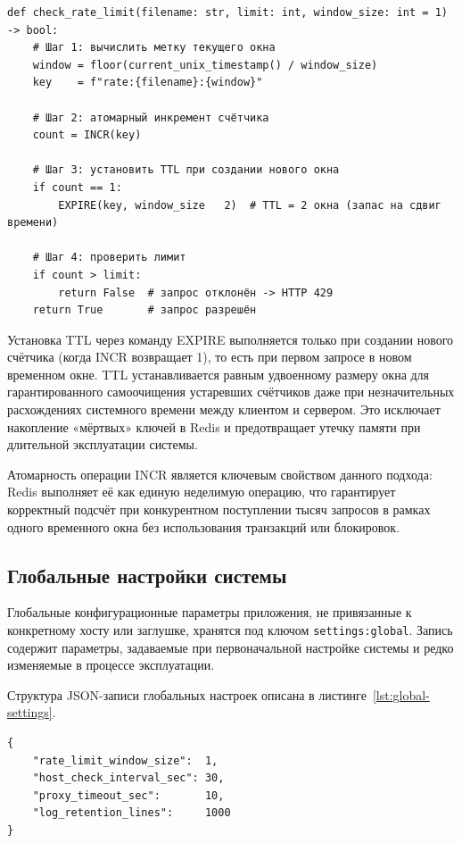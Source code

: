 \begin{listing}[H]
\caption{Псевдокод алгоритма Fixed Window Counter}
\label{lst:rate-limiter}
\begin{verbatim}
def check_rate_limit(filename: str, limit: int, window_size: int = 1) -> bool:
    # Шаг 1: вычислить метку текущего окна
    window = floor(current_unix_timestamp() / window_size)
    key    = f"rate:{filename}:{window}"

    # Шаг 2: атомарный инкремент счётчика
    count = INCR(key)

    # Шаг 3: установить TTL при создании нового окна
    if count == 1:
        EXPIRE(key, window_size   2)  # TTL = 2 окна (запас на сдвиг времени)

    # Шаг 4: проверить лимит
    if count > limit:
        return False  # запрос отклонён -> HTTP 429
    return True       # запрос разрешён
\end{verbatim}
\end{listing}

Установка TTL через команду EXPIRE выполняется только при создании нового счётчика (когда INCR возвращает 1), то есть при первом запросе в новом временном окне. TTL устанавливается равным удвоенному размеру окна для гарантированного самоочищения устаревших счётчиков даже при незначительных расхождениях системного времени между клиентом и сервером. Это исключает накопление «мёртвых» ключей в Redis и предотвращает утечку памяти при длительной эксплуатации системы.

Атомарность операции INCR является ключевым свойством данного подхода: Redis выполняет её как единую неделимую операцию, что гарантирует корректный подсчёт при конкурентном поступлении тысяч запросов в рамках одного временного окна без использования транзакций или блокировок.

\subsection{Глобальные настройки системы}

Глобальные конфигурационные параметры приложения, не привязанные к конкретному хосту или заглушке, хранятся под ключом \texttt{settings:global}. Запись содержит параметры, задаваемые при первоначальной настройке системы и редко изменяемые в процессе эксплуатации.

Структура JSON-записи глобальных настроек описана в листинге~\ref{lst:global-settings}.

\begin{listing}[H]
\caption{Структура глобальных настроек в Redis}
\label{lst:global-settings}
\begin{verbatim}
{
    "rate_limit_window_size":  1,
    "host_check_interval_sec": 30,
    "proxy_timeout_sec":       10,
    "log_retention_lines":     1000
}
\end{verbatim}
\end{listing}

